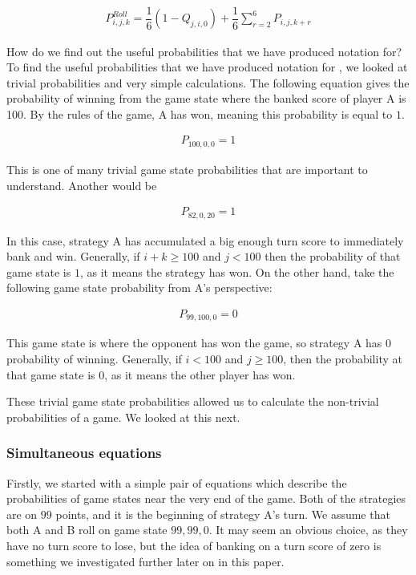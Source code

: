 \documentclass[a4paper,titlepage]{article}
\begin{document}
\begin{align*}
P^{Roll}_{i,j,k} = \dfrac{1}{6} (1-Q_{j,i,0}) + \dfrac{1}{6}\sum^{6}_{r=2}P_{i,j,k+r}
\end{align*}

How do we find out the useful probabilities that we have produced notation for? To find the useful probabilities that we have produced notation for , we looked at trivial probabilities and very simple calculations. The following equation gives the probability of winning from the game state where the banked score of player A is 100. By the rules of the game, A has won, meaning this probability is equal to $1$.

\begin{align*}
	P_{100,0,0}=1
\end{align*}

This is one of many trivial game state probabilities that are important to understand. Another would be

\begin{align*}
	P_{82,0,20}=1
\end{align*}

In this case, strategy A has accumulated a big enough turn score to immediately bank and win. Generally, if $i+k\geq100$ and $j<100$ then the probability of that game state is $1$, as it means the strategy has won. On the other hand, take the following game state probability from A's perspective:

\begin{align*}
	P_{99,100,0}=0
\end{align*}

This game state is where the opponent has won the game, so strategy A has $0$ probability of winning. Generally, if $i<100$ and $j\geq100$, then the probability at that game state is $0$, as it means the other player has won.

These trivial game state probabilities allowed us to calculate the non-trivial probabilities of a game. We looked at this next.

\subsubsection{Simultaneous equations}
Firstly, we started with a simple pair of equations which describe the probabilities of game states near the very end of the game. Both of the strategies are on $99$ points, and it is the beginning of strategy A's turn. We assume that both A and B roll on game state $99,99,0$. It may seem an obvious choice, as they have no turn score to lose, but the idea of banking on a turn score of zero is something we investigated further later on in this paper.
\end{document}
